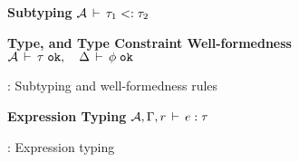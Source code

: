 \begin{figure*}[!ht]
%
\textbf{Subtyping}  \; \fbox
  {\({\mathcal{A}}\,\vdash\,\tau_1 <: \tau_2\)}\\

%
\bigskip

\textbf{Type, and Type Constraint Well-formedness}  \; \fbox
  {\({\mathcal{A}}\,\vdash\,\tau \; \texttt{ok}, \quad 
     \Delta\,\vdash\,\phi \; \texttt{ok}\)}\\

%
\bigskip


%

\caption{\fbname: Subtyping and well-formedness rules}
\label{fig:fb-staticsem-1}
\end{figure*}

\begin{figure*}[!ht]
\textbf{Expression Typing}  \; \fbox
  {\({\mathcal{A}},\Gamma,r\,\vdash\,e:\tau\)}\\

\caption{\fbname: Expression typing}
\label{fig:fb-staticsem-2}
\end{figure*}

